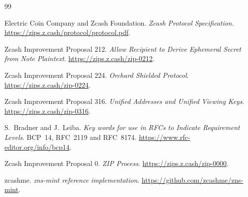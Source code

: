 \documentclass[11pt]{article}
\begin{document}















\begin{thebibliography}{99}

Electric Coin Company and Zcash Foundation.
\emph{Zcash Protocol Specification}.
\url{https://zips.z.cash/protocol/protocol.pdf}.

Zcash Improvement Proposal 212.
\emph{Allow Recipient to Derive Ephemeral Secret from Note Plaintext}.
\url{https://zips.z.cash/zip-0212}.

Zcash Improvement Proposal 224.
\emph{Orchard Shielded Protocol}.
\url{https://zips.z.cash/zip-0224}.

Zcash Improvement Proposal 316.
\emph{Unified Addresses and Unified Viewing Keys}.
\url{https://zips.z.cash/zip-0316}.

S.~Bradner and J.~Leiba.
\emph{Key words for use in RFCs to Indicate Requirement Levels}.
BCP~14, RFC~2119 and RFC~8174.
\url{https://www.rfc-editor.org/info/bcp14}.

Zcash Improvement Proposal 0.
\emph{ZIP Process}.
\url{https://zips.z.cash/zip-0000}.

zcashme.
\emph{zns-mint reference implementation}.
\url{https://github.com/zcashme/zns-mint}.

\end{thebibliography}
\end{document}
